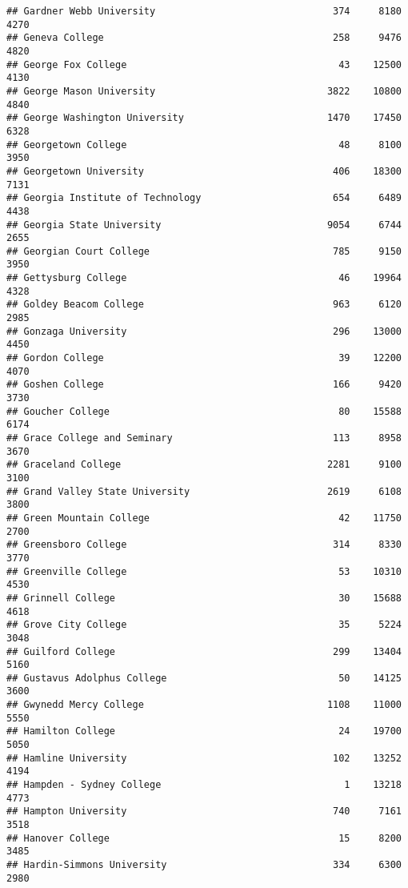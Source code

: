 \documentclass[
]{article}
\begin{document}
\begin{verbatim}
## Gardner Webb University                               374     8180       4270
## Geneva College                                        258     9476       4820
## George Fox College                                     43    12500       4130
## George Mason University                              3822    10800       4840
## George Washington University                         1470    17450       6328
## Georgetown College                                     48     8100       3950
## Georgetown University                                 406    18300       7131
## Georgia Institute of Technology                       654     6489       4438
## Georgia State University                             9054     6744       2655
## Georgian Court College                                785     9150       3950
## Gettysburg College                                     46    19964       4328
## Goldey Beacom College                                 963     6120       2985
## Gonzaga University                                    296    13000       4450
## Gordon College                                         39    12200       4070
## Goshen College                                        166     9420       3730
## Goucher College                                        80    15588       6174
## Grace College and Seminary                            113     8958       3670
## Graceland College                                    2281     9100       3100
## Grand Valley State University                        2619     6108       3800
## Green Mountain College                                 42    11750       2700
## Greensboro College                                    314     8330       3770
## Greenville College                                     53    10310       4530
## Grinnell College                                       30    15688       4618
## Grove City College                                     35     5224       3048
## Guilford College                                      299    13404       5160
## Gustavus Adolphus College                              50    14125       3600
## Gwynedd Mercy College                                1108    11000       5550
## Hamilton College                                       24    19700       5050
## Hamline University                                    102    13252       4194
## Hampden - Sydney College                                1    13218       4773
## Hampton University                                    740     7161       3518
## Hanover College                                        15     8200       3485
## Hardin-Simmons University                             334     6300       2980

\end{verbatim}
\end{document}

